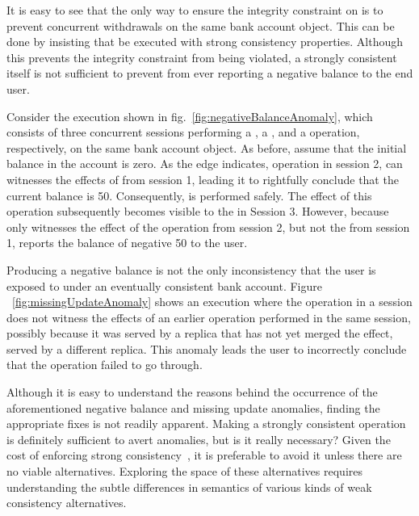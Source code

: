 It is easy to see that the only way to ensure the integrity constraint on
 is to prevent concurrent withdrawals on the same bank account
object. This can be done by insisting that  be executed with
strong consistency properties. Although this prevents the integrity constraint
from being violated, a strongly consistent  itself is not
sufficient to prevent  from ever reporting a negative balance to
the end user.

Consider the execution shown in fig.~\ref{fig:negativeBalanceAnomaly}, which
consists of three concurrent sessions performing a , a
, and a  operation, respectively, on the same bank
account object. As before, assume that the initial balance in the account is
zero. As the  edge indicates, operation  in session 2,
can witnesses the effects of  from session 1, leading it to
rightfully conclude that the current balance is 50. Consequently,
 is performed safely. The effect of this 
operation subsequently becomes visible to the  in Session 3.
However, because  only witnesses the effect of the 
operation from session 2, but not the  from session 1, reports the
balance of negative 50 to the user.

Producing a negative balance is not the only inconsistency that the user is
exposed to under an eventually consistent bank account. Figure
~\ref{fig:missingUpdateAnomaly} shows an execution where the 
operation in a session does not witness the effects of an earlier 
operation performed in the same session, possibly because it was served by a
replica that has not yet merged the  effect, served by a different
replica. This anomaly leads the user to incorrectly conclude that the
 operation failed to go through.

Although it is easy to understand the reasons behind the occurrence of the
aforementioned negative balance and missing update anomalies, finding the
appropriate fixes is not readily apparent. Making  a strongly
consistent operation is definitely sufficient to avert anomalies, but is it
really necessary? Given the cost of enforcing strong
consistency~\cite{DynamoDB, Pileus}, it is preferable to avoid it unless
there are no viable alternatives.  Exploring the space of these alternatives
requires understanding the subtle differences in semantics of various kinds
of weak consistency alternatives.

